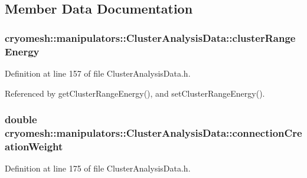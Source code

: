 \subsection{\-Member \-Data \-Documentation}
\hypertarget{classcryomesh_1_1manipulators_1_1ClusterAnalysisData_a2cc91850c86c1a09509266b639cbacdb}{
\subsubsection[{cluster\-Range\-Energy}]{ {\bf cryomesh\-::manipulators\-::\-Cluster\-Analysis\-Data\-::cluster\-Range\-Energy}}}\label{classcryomesh_1_1manipulators_1_1ClusterAnalysisData_a2cc91850c86c1a09509266b639cbacdb}


\-Definition at line 157 of file \-Cluster\-Analysis\-Data.\-h.



\-Referenced by get\-Cluster\-Range\-Energy(), and set\-Cluster\-Range\-Energy().

\hypertarget{classcryomesh_1_1manipulators_1_1ClusterAnalysisData_a25abb815b2869d410c9d32819471d67b}{
\subsubsection[{connection\-Creation\-Weight}]{\setlength{\rightskip}{0pt plus 5cm}double {\bf cryomesh\-::manipulators\-::\-Cluster\-Analysis\-Data\-::connection\-Creation\-Weight}}}\label{classcryomesh_1_1manipulators_1_1ClusterAnalysisData_a25abb815b2869d410c9d32819471d67b}


\-Definition at line 175 of file \-Cluster\-Analysis\-Data.\-h.



